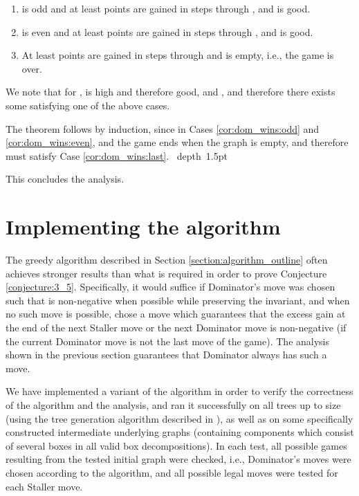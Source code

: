 \documentclass[11pt]{article}
\def\blackslug{\hbox{\hskip 1pt \vrule width 4pt height 8pt
    depth 1.5pt \hskip 1pt}}
\def\QED{\quad\blackslug\lower 8.5pt\null\par}
\def\dnsitem{\vspace{-7pt}\item}
\theoremstyle{definition}
\begin{document}
\begin{enumerate}
	\dnsitem \label{cor:dom_wins:odd}
	 is odd and at least  points are gained in steps  through , and  is good.
	
	\dnsitem \label{cor:dom_wins:even}
	 is even and at least  points are gained in steps  through , and  is good.
	
	\dnsitem \label{cor:dom_wins:last}
	At least  points are gained in steps  through  and  is empty, i.e., the game is over.
\end{enumerate}

We note that for ,  is high and therefore good,
and , and therefore there exists some  satisfying one of the above cases.

The theorem follows by induction, since  in Cases \ref{cor:dom_wins:odd} and \ref{cor:dom_wins:even}, and the game ends when the graph is empty, and therefore  must satisfy Case \ref{cor:dom_wins:last}.
\QED

This concludes the analysis.

\section{Implementing the algorithm}
\label{section:implementation}

The greedy algorithm described in Section \ref{section:algorithm_outline} often achieves stronger results than what is required in order to prove Conjecture \ref{conjecture:3_5}.
Specifically, it would suffice if Dominator's move was chosen such that  is non-negative when possible while preserving the invariant, 
and when no such move is possible, chose a move which guarantees that the excess gain at the end of the next Staller move or the next Dominator move is non-negative (if the current Dominator move is not the last move of the game).
The analysis shown in the previous section guarantees that Dominator always has such a move.

We have implemented a variant of the algorithm in order to verify the correctness of the algorithm and the analysis, 
and ran it successfully on all trees up to size  (using the tree generation algorithm described in \cite{wright1986constant}),
as well as on some specifically constructed intermediate underlying graphs (containing components which consist of several boxes in all valid box decompositions).
In each test, all possible games resulting from the tested initial graph were checked, i.e., Dominator's moves were chosen according to the algorithm, and all possible legal moves were tested for each Staller move.
\end{document}
